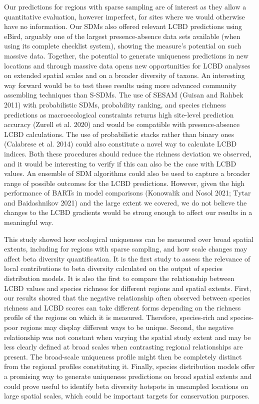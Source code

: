 \documentclass[11pt]{article}
\begin{document}
Our predictions for regions with sparse sampling are of interest as they
allow a quantitative evaluation, however imperfect, for sites where we
would otherwise have no information. Our SDMs also offered relevant LCBD
predictions using eBird, arguably one of the largest presence-absence
data sets available (when using its complete checklist system), showing
the measure's potential on such massive data. Together, the potential to
generate uniqueness predictions in new locations and through massive
data opens new opportunities for LCBD analyses on extended spatial
scales and on a broader diversity of taxons. An interesting way forward
would be to test these results using more advanced community assembling
techniques than S-SDMs. The use of SESAM (Guisan and Rahbek 2011) with
probabilistic SDMs, probability ranking, and species richness
predictions as macroecological constraints returns high site-level
prediction accuracy (Zurell et al. 2020) and would be compatible with
presence-absence LCBD calculations. The use of probabilistic stacks
rather than binary ones (Calabrese et al. 2014) could also constitute a
novel way to calculate LCBD indices. Both these procedures should reduce
the richness deviation we observed, and it would be interesting to
verify if this can also be the case with LCBD values. An ensemble of SDM
algorithms could also be used to capture a broader range of possible
outcomes for the LCBD predictions. However, given the high performance
of BARTs in model comparisons (Konowalik and Nosol 2021; Tytar and
Baidashnikov 2021) and the large extent we covered, we do not believe
the changes to the LCBD gradients would be strong enough to affect our
results in a meaningful way.

This study showed how ecological uniqueness can be measured over broad
spatial extents, including for regions with sparse sampling, and how
scale changes may affect beta diversity quantification. It is the first
study to assess the relevance of local contributions to beta diversity
calculated on the output of species distribution models. It is also the
first to compare the relationship between LCBD values and species
richness for different regions and spatial extents. First, our results
showed that the negative relationship often observed between species
richness and LCBD scores can take different forms depending on the
richness profile of the regions on which it is measured. Therefore,
species-rich and species-poor regions may display different ways to be
unique. Second, the negative relationship was not constant when varying
the spatial study extent and may be less clearly defined at broad scales
when contrasting regional relationships are present. The broad-scale
uniqueness profile might then be completely distinct from the regional
profiles constituting it. Finally, species distribution models offer a
promising way to generate uniqueness predictions on broad spatial
extents and could prove useful to identify beta diversity hotspots in
unsampled locations on large spatial scales, which could be important
targets for conservation purposes.
\end{document}

